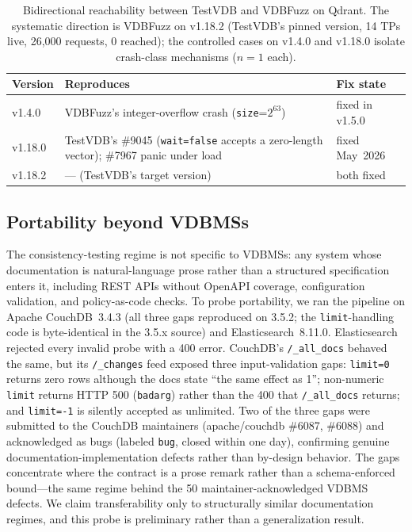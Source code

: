 \documentclass[sigconf]{acmart}
\begin{document}
\begin{table}[t]
\caption{Bidirectional reachability between TestVDB and VDBFuzz on Qdrant. The systematic direction is VDBFuzz on v1.18.2 (TestVDB's pinned version, 14 TPs live, 26{,}000 requests, 0 reached); the controlled cases on v1.4.0 and v1.18.0 isolate crash-class mechanisms ($n{=}1$ each).}
\label{tab:versions}
\small
\begin{tabular}{@{}p{}p{}p{}@{}}
\toprule
Version & Reproduces & Fix state \\
\midrule
v1.4.0 & VDBFuzz's integer-overflow crash (\texttt{size}=$2^{63}$) & fixed in v1.5.0 \\
v1.18.0 & TestVDB's \#9045 (\texttt{wait=false} accepts a zero-length vector); \#7967 panic under load & fixed May~2026 \\
v1.18.2 & --- (TestVDB's target version) & both fixed \\
\bottomrule
\end{tabular}
\end{table}

\subsection{Portability beyond VDBMSs}
\label{subsec:portability}

The consistency-testing regime is not specific to VDBMSs: any system whose documentation is natural-language prose rather than a structured specification enters it, including REST APIs without OpenAPI coverage, configuration validation, and policy-as-code checks. To probe portability, we ran the pipeline on Apache CouchDB~3.4.3 (all three gaps reproduced on 3.5.2; the \texttt{limit}-handling code is byte-identical in the 3.5.x source) and Elasticsearch~8.11.0. Elasticsearch rejected every invalid probe with a 400 error. CouchDB's \texttt{/\_all\_docs} behaved the same, but its \texttt{/\_changes} feed exposed three input-validation gaps: \texttt{limit=0} returns zero rows although the docs state ``the same effect as 1''; non-numeric \texttt{limit} returns HTTP 500 (\texttt{badarg}) rather than the 400 that \texttt{/\_all\_docs} returns; and \texttt{limit=-1} is silently accepted as unlimited. Two of the three gaps were submitted to the CouchDB maintainers (apache/couchdb \#6087, \#6088) and acknowledged as bugs (labeled \texttt{bug}, closed within one day), confirming genuine documentation-implementation defects rather than by-design behavior. The gaps concentrate where the contract is a prose remark rather than a schema-enforced bound---the same regime behind the 50 maintainer-acknowledged VDBMS defects. We claim transferability only to structurally similar documentation regimes, and this probe is preliminary rather than a generalization result.
\end{document}
